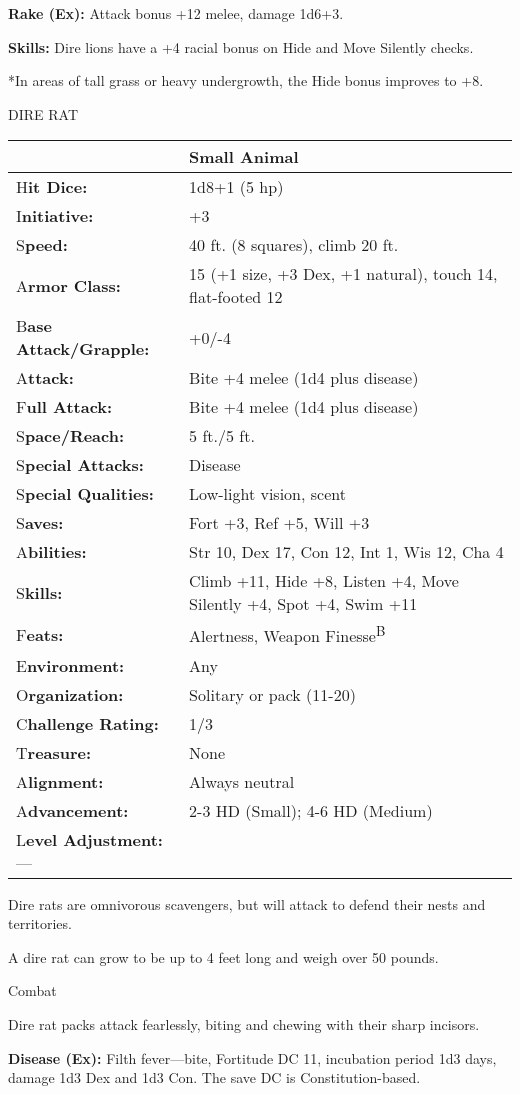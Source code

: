 \documentclass{article}
\begin{document}
\textbf{Rake (Ex):} Attack bonus +12 melee, damage 1d6+3.

\textbf{Skills: }Dire lions have a +4 racial bonus on Hide and Move Silently checks. 

*In areas of tall grass or heavy undergrowth, the Hide bonus improves to +8.

\vspace{12pt}
DIRE RAT

\begin{tabular}{|>{\raggedright}p{91pt}|>{\raggedright}p{231pt}|}
\hline
  & Small Animal\tabularnewline
\hline
H\textbf{it Dice:} & 1d8+1 (5 hp)\tabularnewline
\hline
I\textbf{nitiative:} & +3\tabularnewline
\hline
S\textbf{peed:} & 40 ft. (8 squares), climb 20 ft.\tabularnewline
\hline
A\textbf{rmor Class:} & 15 (+1 size, +3 Dex, +1 natural), touch 14, flat-footed 
12\tabularnewline
\hline
B\textbf{ase Attack/Grapple:} & +0/-4\tabularnewline
\hline
A\textbf{ttack:} & Bite +4 melee (1d4 plus disease)\tabularnewline
\hline
F\textbf{ull Attack:} & Bite +4 melee (1d4 plus disease)\tabularnewline
\hline
S\textbf{pace/Reach:} & 5 ft./5 ft.\tabularnewline
\hline
S\textbf{pecial Attacks:} & Disease\tabularnewline
\hline
S\textbf{pecial Qualities:} & Low-light vision, scent\tabularnewline
\hline
S\textbf{aves:} & Fort +3, Ref +5, Will +3\tabularnewline
\hline
A\textbf{bilities:} & Str 10, Dex 17, Con 12, Int 1, Wis 12, Cha 4\tabularnewline
\hline
S\textbf{kills:} & Climb +11, Hide +8, Listen +4, Move Silently +4, Spot +4, Swim 
+11\tabularnewline
\hline
F\textbf{eats:} & Alertness, Weapon Finesse\textsuperscript{B}\tabularnewline
\hline
E\textbf{nvironment:} & Any\tabularnewline
\hline
O\textbf{rganization:} & Solitary or pack (11-20)\tabularnewline
\hline
C\textbf{hallenge Rating:} & 1/3\tabularnewline
\hline
T\textbf{reasure:} & None\tabularnewline
\hline
A\textbf{lignment:} & Always neutral\tabularnewline
\hline
A\textbf{dvancement:} & 2-3 HD (Small); 4-6 HD (Medium)\tabularnewline
\hline
L\textbf{evel Adjustment:}--- & \tabularnewline
\hline
\end{tabular}

Dire rats are omnivorous scavengers, but will attack to defend their nests and 
territories.

A dire rat can grow to be up to 4 feet long and weigh over 50 pounds.

Combat

Dire rat packs attack fearlessly, biting and chewing with their sharp incisors.

\textbf{Disease (Ex):} Filth fever---bite, Fortitude DC 11, incubation period 1d3 
days, damage 1d3 Dex and 1d3 Con. The save DC is Constitution-based.
\end{document}
